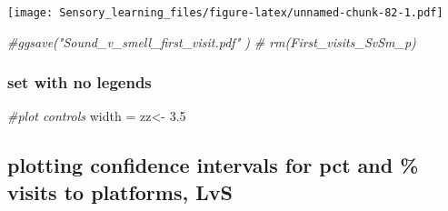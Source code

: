 \documentclass[]{article}
\newenvironment{Shaded}{\begin{snugshade}}{\end{snugshade}}
\newcommand{\FloatTok}[1]{\textcolor[rgb]{0.00,0.00,0.81}{{#1}}}
\newcommand{\StringTok}[1]{\textcolor[rgb]{0.31,0.60,0.02}{{#1}}}
\newcommand{\CommentTok}[1]{\textcolor[rgb]{0.56,0.35,0.01}{\textit{{#1}}}}
\newcommand{\NormalTok}[1]{{#1}}
\begin{document}
\texttt{[image: Sensory\_learning\_files/figure-latex/unnamed-chunk-82-1.pdf]}

\begin{Shaded}
\begin{Highlighting}[]
  \CommentTok{#ggsave("Sound_v_smell_first_visit.pdf"  )}
 \CommentTok{# rm(First_visits_SvSm_p)}
\end{Highlighting}
\end{Shaded}

\subsubsection{set with no legends}\label{set-with-no-legends}

\begin{Shaded}
\begin{Highlighting}[]
\CommentTok{#plot controls}
\NormalTok{width =}\StringTok{ }\NormalTok{zz<-}\StringTok{  }\FloatTok{3.5}
\end{Highlighting}
\end{Shaded}

\subsection{plotting confidence intervals for pct and \% visits to
platforms,
LvS}\label{plotting-confidence-intervals-for-pct-and-visits-to-platforms-lvs-2}
\end{document}
